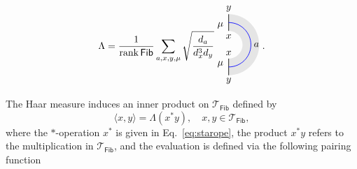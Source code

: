 \documentclass[a4paper,11pt]{article}
\theoremstyle{theorem}
\theoremstyle{remark}
\newcommand{\Fib}{\mathsf{Fib}}
\begin{document}
\begin{equation}\label{eq:HaarMTube}
    \Lambda = \frac{1}{\operatorname{rank} \Fib} \sum_{a,x,y,\mu} 
    \sqrt{\frac{d_a}{d_x^3 d_y}}
        \begin{aligned}
    \begin{tikzpicture}
        \begin{scope}
            \fill[gray!20]
                (0,1.1) arc[start angle=90, end angle=-90, radius=1.1] -- 
                (0,-0.5) arc[start angle=-90, end angle=90, radius=0.5] -- cycle;
        \end{scope}
           \draw[line width=0.6pt,black] (0,0.5)--(0,1.1);
        \draw[line width=.6pt,black] (0,-0.5)--(0,-1.1);
        \draw[blue, line width=0.6pt] (0,-0.8) arc[start angle=-90, end angle=90, radius=0.8];
        \node[line width=0.6pt, dashed, draw opacity=0.5] at (0,1.3) {$y$};
        \node[line width=0.6pt, dashed, draw opacity=0.5] at (0,-1.3) {$y$};
        \node[line width=0.6pt, dashed, draw opacity=0.5] at (1,0) {$a$};
        \node[line width=0.6pt, dashed, draw opacity=0.5] at (-0.3,-0.7) {$\mu$};
        \node[line width=0.6pt, dashed, draw opacity=0.5] at (0,-0.3) {$x$};
        \node[line width=0.6pt, dashed, draw opacity=0.5] at (0,0.3) {$x$};
        \node[line width=0.6pt, dashed, draw opacity=0.5] at (-0.3,0.7) {$\mu$};
    \end{tikzpicture}
\end{aligned}.
\end{equation}
The Haar measure induces an inner product on $\mathcal{T}_{\Fib}$ defined by
\begin{equation}
    \langle x, y \rangle = \Lambda(x^* y), \quad x, y \in \mathcal{T}_{\Fib},
\end{equation}
where the $*$-operation $x^*$ is given in Eq.~\eqref{eq:starope}, 
the product $x^* y$ refers to the multiplication in $\mathcal{T}_{\Fib}$, 
and the evaluation is defined via the following pairing function
\end{document}
